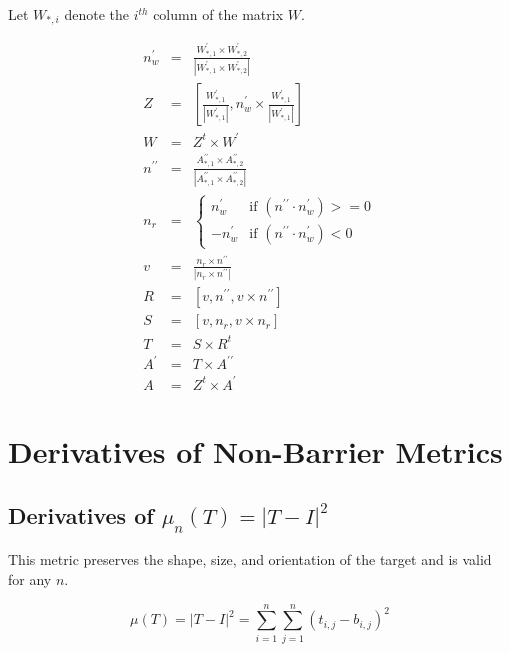 \documentclass{report}
\begin{document}
Let $W_{*,i}$ denote the $i^{th}$ column of the matrix $W$.

\begin{eqnarray}
n^\prime_w &=& \frac{W^\prime_{*,1} \times W^\prime_{*,2}}
                   {|W^\prime_{*,1} \times W^\prime_{*,2}|} \\
Z &=& \left[ \frac{W^\prime_{*,1}}{|W^\prime_{*,1}|}, 
              n^\prime_w \times \frac{W^\prime_{*,1}}{|W^\prime_{*,1}|} \right] \\
W &=& Z^t \times W^\prime \\
n^{\prime\prime} &=& \frac{A^{\prime\prime}_{*,1} \times A^{\prime\prime}_{*,2}}
                       {|A^{\prime\prime}_{*,1} \times A^{\prime\prime}_{*,2}|} \\
n_r &=& \left\{ \begin{array}{ll} 
         n^\prime_w & \textrm{if $(n^{\prime\prime} \cdot n^\prime_w) >= 0$} \\
        -n^\prime_w & \textrm{if $(n^{\prime\prime} \cdot n^\prime_w) < 0$}
        \end{array} \right. \\
v &=& \frac{n_r \times n^{\prime\prime}}{|n_r \times n^{\prime\prime}|} \\
R &=& \left[ v, n^{\prime\prime}, v \times n^{\prime\prime} \right] \\
S &=& \left[ v, n_r, v \times n_r \right] \\
T &=& S \times R^t \\
A^\prime &=& T \times A^{\prime\prime} \\
A &=& Z^t \times A^\prime
\end{eqnarray}

\section{Derivatives of Non-Barrier Metrics}

\subsection{Derivatives of $\mu_n (T)=|T-I|^2$ \label{tmi}}

\noindent  This metric preserves the shape, size, and orientation of the target and is valid for any $n$. \newline

\begin{equation}
\mu(T) = |T-I|^2 = \sum_{i=1}^n \sum_{j=1}^n (t_{i,j} - b_{i,j})^2
\end{equation}
\end{document}

